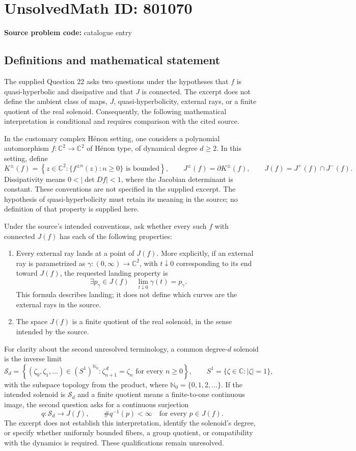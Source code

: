 \documentclass[11pt]{article}
\newcommand{\N}{\mathbb{N}}
\newcommand{\C}{\mathbb{C}}
\begin{document}
\section*{UnsolvedMath ID: 801070}
\textbf{Source problem code:} catalogue entry
\subsection{Definitions and mathematical statement}
The supplied Question 22 asks two questions under the hypotheses that \(f\) is quasi-hyperbolic and dissipative and that \(J\) is connected. The excerpt does not define the ambient class of maps, \(J\), quasi-hyperbolicity, external rays, or a finite quotient of the real solenoid. Consequently, the following mathematical interpretation is conditional and requires comparison with the cited source.

In the customary complex H\'enon setting, one considers a polynomial automorphism \(f:\C^2\to\C^2\) of H\'enon type, of dynamical degree \(d\geq 2\). In this setting, define
\[
K^{\pm}(f)=\left\{z\in\C^2:\{f^{\pm n}(z):n\geq 0\}\text{ is bounded}\right\},\qquad
J^{\pm}(f)=\partial K^{\pm}(f),\qquad
J(f)=J^+(f)\cap J^-(f).
\]
Dissipativity means \(0<|\det Df|<1\), where the Jacobian determinant is constant. These conventions are not specified in the supplied excerpt. The hypothesis of quasi-hyperbolicity must retain its meaning in the source; no definition of that property is supplied here.

Under the source's intended conventions, ask whether every such \(f\) with connected \(J(f)\) has each of the following properties:
\begin{enumerate}
\item Every external ray lands at a point of \(J(f)\). More explicitly, if an external ray is parametrized as \(\gamma:(0,\infty)\to\C^2\), with \(t\downarrow 0\) corresponding to its end toward \(J(f)\), the requested landing property is
\[
\exists p_\gamma\in J(f)\quad \lim_{t\downarrow 0}\gamma(t)=p_\gamma.
\]
This formula describes landing; it does not define which curves are the external rays in the source.
\item The space \(J(f)\) is a finite quotient of the real solenoid, in the sense intended by the source.
\end{enumerate}
For clarity about the second unresolved terminology, a common degree-\(d\) solenoid is the inverse limit
\[
\mathcal S_d=\left\{(\zeta_0,\zeta_1,\ldots)\in(S^1)^{\N_0}:\zeta_{n+1}^{\,d}=\zeta_n\text{ for every }n\geq 0\right\},\qquad
S^1=\{\zeta\in\C:|\zeta|=1\},
\]
with the subspace topology from the product, where \(\N_0=\{0,1,2,\ldots\}\). If the intended solenoid is \(\mathcal S_d\) and a finite quotient means a finite-to-one continuous image, the second question asks for a continuous surjection
\[
q:\mathcal S_d\longrightarrow J(f),\qquad
\#q^{-1}(p)<\infty\quad\text{for every }p\in J(f).
\]
The excerpt does not establish this interpretation, identify the solenoid's degree, or specify whether uniformly bounded fibers, a group quotient, or compatibility with the dynamics is required. These qualifications remain unresolved.
\end{document}
